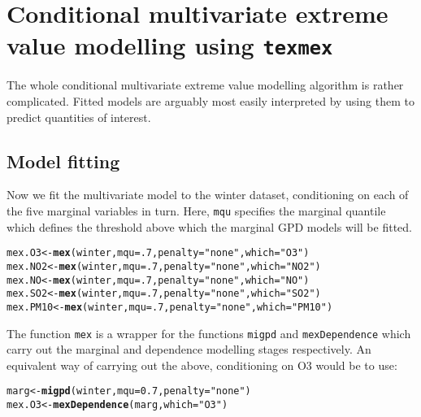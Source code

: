 \documentclass[10pt]{article}\usepackage[]{graphicx}\usepackage[]{color}
\makeatletter
\newcommand{\hlnum}[1]{\textcolor[rgb]{0.686,0.059,0.569}{#1}}%
\newcommand{\hlstr}[1]{\textcolor[rgb]{0.192,0.494,0.8}{#1}}%
\newcommand{\hlstd}[1]{\textcolor[rgb]{0.345,0.345,0.345}{#1}}%
\newcommand{\hlkwb}[1]{\textcolor[rgb]{0.69,0.353,0.396}{#1}}%
\newcommand{\hlkwc}[1]{\textcolor[rgb]{0.333,0.667,0.333}{#1}}%
\newcommand{\hlkwd}[1]{\textcolor[rgb]{0.737,0.353,0.396}{\textbf{#1}}}%
\newenvironment{kframe}{%
 \def\at@end@of@kframe{}%
 \ifinner\ifhmode%
  \def\at@end@of@kframe{\end{minipage}}%
  \begin{minipage}{\columnwidth}%
 \fi\fi%
 \def\FrameCommand##1{\hskip\@totalleftmargin \hskip-\fboxsep
 \colorbox{shadecolor}{##1}\hskip-\fboxsep
     \hskip-\linewidth \hskip-\@totalleftmargin \hskip\columnwidth}%
 \MakeFramed {\advance\hsize-\width
   \@totalleftmargin\z@ \linewidth\hsize
   \@setminipage}}%
 {\par\unskip\endMakeFramed%
 \at@end@of@kframe}
\newenvironment{knitrout}{}{} %
\makeatother
\begin{document}
\section{Conditional multivariate extreme value modelling using {\tt texmex}}
%
The whole conditional multivariate extreme value modelling algorithm is rather
complicated. Fitted models are arguably most easily interpreted by using them to
predict quantities of interest.
%
\subsection{Model fitting}
%
Now we fit the multivariate model to the winter dataset, conditioning on each of
the five marginal variables in turn.  Here, {\tt mqu} specifies the marginal
quantile which defines the threshold above which the marginal GPD models will be
fitted.

\begin{knitrout}
\color{fgcolor}\begin{kframe}
\begin{alltt}
\hlstd{mex.O3}  \hlkwb{<-} \hlkwd{mex}\hlstd{(winter,} \hlkwc{mqu}\hlstd{=}\hlnum{.7}\hlstd{,} \hlkwc{penalty}\hlstd{=}\hlstr{"none"}\hlstd{,} \hlkwc{which}\hlstd{=}\hlstr{"O3"}\hlstd{)}
\hlstd{mex.NO2} \hlkwb{<-} \hlkwd{mex}\hlstd{(winter,} \hlkwc{mqu}\hlstd{=}\hlnum{.7}\hlstd{,} \hlkwc{penalty}\hlstd{=}\hlstr{"none"}\hlstd{,} \hlkwc{which}\hlstd{=}\hlstr{"NO2"}\hlstd{)}
\hlstd{mex.NO}  \hlkwb{<-} \hlkwd{mex}\hlstd{(winter,} \hlkwc{mqu}\hlstd{=}\hlnum{.7}\hlstd{,} \hlkwc{penalty}\hlstd{=}\hlstr{"none"}\hlstd{,} \hlkwc{which}\hlstd{=}\hlstr{"NO"}\hlstd{)}
\hlstd{mex.SO2} \hlkwb{<-} \hlkwd{mex}\hlstd{(winter,} \hlkwc{mqu}\hlstd{=}\hlnum{.7}\hlstd{,} \hlkwc{penalty}\hlstd{=}\hlstr{"none"}\hlstd{,} \hlkwc{which}\hlstd{=}\hlstr{"SO2"}\hlstd{)}
\hlstd{mex.PM10} \hlkwb{<-} \hlkwd{mex}\hlstd{(winter,} \hlkwc{mqu}\hlstd{=}\hlnum{.7}\hlstd{,} \hlkwc{penalty}\hlstd{=}\hlstr{"none"}\hlstd{,} \hlkwc{which}\hlstd{=}\hlstr{"PM10"}\hlstd{)}
\end{alltt}
\end{kframe}
\end{knitrout}

The function {\tt mex} is a wrapper for the functions {\tt migpd} and {\tt mexDependence} which carry out the marginal and dependence modelling stages respectively.  An equivalent way of carrying out the above, conditioning on O3 would be to use:

\begin{knitrout}
\color{fgcolor}\begin{kframe}
\begin{alltt}
\hlstd{marg} \hlkwb{<-} \hlkwd{migpd}\hlstd{(winter,} \hlkwc{mqu}\hlstd{=}\hlnum{0.7}\hlstd{,} \hlkwc{penalty}\hlstd{=}\hlstr{"none"}\hlstd{)}
\hlstd{mex.O3} \hlkwb{<-} \hlkwd{mexDependence}\hlstd{(marg,} \hlkwc{which} \hlstd{=} \hlstr{"O3"}\hlstd{)}
\end{alltt}
\end{kframe}
\end{knitrout}
\end{document}

